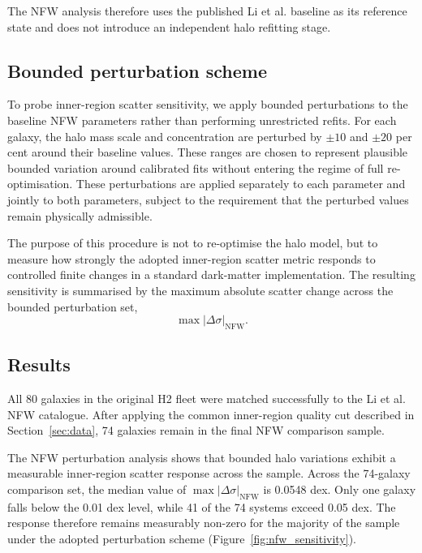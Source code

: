 \documentclass[fleqn,usenatbib]{mnras}
\begin{document}
The NFW analysis therefore uses the published Li et al. baseline as its
reference state and does not introduce an independent halo refitting stage.

\subsection{Bounded perturbation scheme}
\label{subsec:nfw_perturbation}

To probe inner-region scatter sensitivity, we apply bounded perturbations to
the baseline NFW parameters rather than performing unrestricted refits. For
each galaxy, the halo mass scale and concentration are perturbed by
$\pm10$ and $\pm20$ per cent around their baseline values. These ranges are chosen to represent plausible bounded variation around calibrated fits without entering the regime of full re-optimisation. These
perturbations are applied separately to each parameter and jointly to both
parameters, subject to the requirement that the perturbed values remain
physically admissible.

The purpose of this procedure is not to re-optimise the halo model, but to
measure how strongly the adopted inner-region scatter metric responds to
controlled finite changes in a standard dark-matter implementation. The
resulting sensitivity is summarised by the maximum absolute scatter change
across the bounded perturbation set,
\begin{equation}
	\max |\Delta \sigma|_{\mathrm{NFW}}.
\end{equation}

\subsection{Results}
\label{subsec:nfw_results}

All 80 galaxies in the original H2 fleet were matched successfully to the
Li et al. NFW catalogue. After applying the common inner-region quality cut
described in Section~\ref{sec:data}, 74 galaxies remain in the final NFW
comparison sample.

The NFW perturbation analysis shows that bounded halo variations
exhibit a measurable inner-region scatter response across the sample. Across the 74-galaxy
comparison set, the median value of
$\max |\Delta \sigma|_{\mathrm{NFW}}$ is 0.0548 dex. Only one galaxy falls
below the 0.01 dex level, while 41 of the 74 systems exceed 0.05 dex. The
response therefore remains measurably non-zero for the majority of the
sample under the adopted perturbation scheme (Figure~\ref{fig:nfw_sensitivity}).
\end{document}
